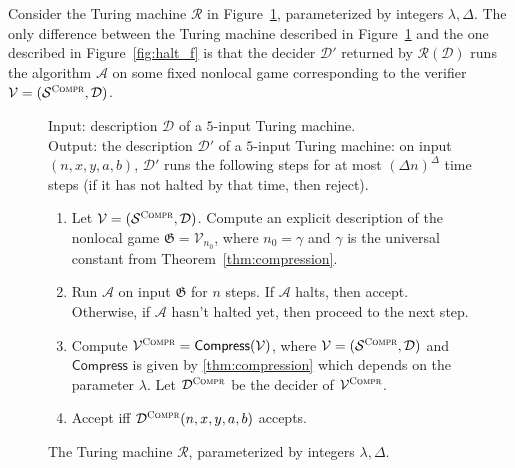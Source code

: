 \documentclass[11pt]{article}
\theoremstyle{definition}
\newcommand{\game}{\mathfrak{G}}
\newcommand{\sampler}{\mathcal{S}}
\newcommand{\decider}{\mathcal{D}}
\newcommand{\verifier}{\mathcal{V}}
\newcommand{\gamestyle}[1]{\ensuremath{\textsc{#1}}\xspace}
\newcommand{\compr}{\textsc{Compr}}
\renewcommand{\cal}[1]{\mathcal{#1}}
\newcommand{\tmstyle}[1]{\ensuremath{\mathsf{#1}}}
\newcommand{\Compress}{\tmstyle{Compress}}
\newenvironment{gamespec}{
  \begin{mdframed}[style=figstyle]}{
  \end{mdframed}}
\begin{document}
Consider the Turing machine $\cal{R}$ in Figure~\ref{fig:separation},
parameterized by integers $\lambda, \Delta$.
The only difference between the Turing machine described in
Figure~\ref{fig:separation} and the one described in Figure~\ref{fig:halt_f} is
that the decider $\decider'$ returned by $\cal{R}(\decider)$ runs the algorithm
$\cal{A}$ on some fixed nonlocal game corresponding to the verifier $\verifier =
(\sampler^\compr,\decider)$.

\newcommand{\sep}{\gamestyle{Sep}}

\begin{figure}[H]
  \centering
  \begin{gamespec}
  	Input: description $\decider$ of a $5$-input Turing machine.
    \\[9pt]
    Output: the description $\decider'$ of a $5$-input Turing machine: on input
    $(n,x,y,a,b)$, $\decider'$ runs the following steps for at most $(\Delta
    n)^\Delta$ time steps (if it has not halted by that time, then reject).
    \begin{enumerate}
    \item Let $\verifier = (\sampler^\compr,\decider)$.
      Compute an explicit description of the nonlocal game $\game =
      \verifier_{n_0}$, where $n_0 = \gamma$ and $\gamma$ is the universal constant from
      Theorem~\ref{thm:compression}.
    \item Run $\cal{A}$ on input $\game$ for $n$ steps.
      If $\cal{A}$ halts, then accept.
      Otherwise, if $\cal{A}$ hasn't halted yet, then proceed to the next step.
    \item Compute $\verifier^\compr = \Compress(\verifier)$, where $\verifier =
      (\sampler^\compr, \decider)$ and $\Compress$ is given by
      \cref{thm:compression} which depends on the parameter $\lambda$.
      Let $\decider^\compr$ be the decider of $\verifier^\compr$.
    \item Accept iff $\decider^\compr(n,x,y,a,b)$ accepts.
    \end{enumerate}
  \end{gamespec}
  \caption{The Turing machine $\cal{R}$, parameterized by integers
    $\lambda,\Delta$.}
  \label{fig:separation}
\end{figure}
\end{document}
